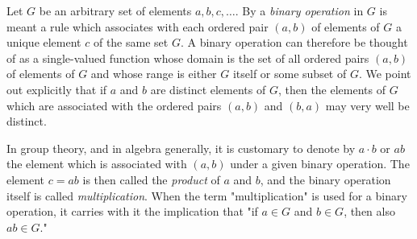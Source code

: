 Let $G$ be an arbitrary set of elements $a, b, c, \ldots$. By a \textit{binary operation} in $G$ is meant a rule which associates with each ordered pair $(a, b)$ of elements of $G$ a unique element $c$ of the same set $G$. A binary operation can therefore be thought of as a single-valued function whose domain is the set of all ordered pairs $(a, b)$ of elements of $G$ and whose range is either $G$ itself or some subset of $G$. We point out explicitly that if $a$ and $b$ are distinct elements of $G$, then the elements of $G$ which are associated with the ordered pairs $(a, b)$ and $(b, a)$ may very well be distinct.

In group theory, and in algebra generally, it is customary to denote by $a \cdot b$ or $ab$ the element which is associated with $(a, b)$ under a given binary operation. The element $c = ab$ is then called the \textit{product} of $a$ and $b$, and the binary operation itself is called \textit{multiplication}. When the term "multiplication" is used for a binary operation, it carries with it the implication that "if $a \in G$ and $b \in G$, then also $ab \in G$."
